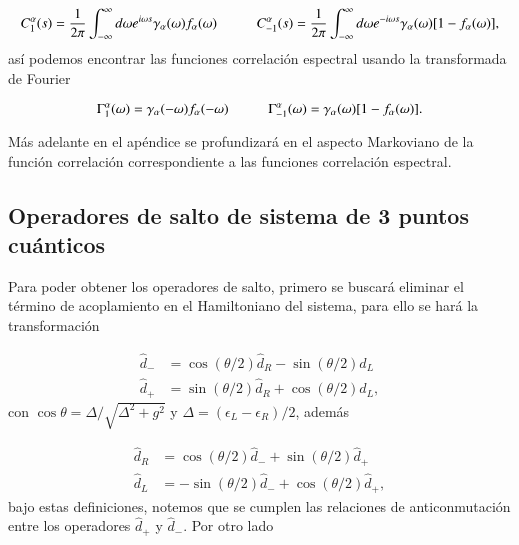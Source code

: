 \begin{appendixs}
\begin{equation*}
    C_{1}^{\alpha}(s) = \frac{1}{2\pi} \int_{-\infty}^{\infty}d\omega e^{i\omega s} \gamma_{\alpha}(\omega) f_{\alpha}(\omega)  \hspace{10mm} C_{-1}^{\alpha}(s) = \frac{1}{2\pi} \int_{-\infty}^{\infty}d\omega e^{-i\omega s} \gamma_{\alpha}(\omega) [1-f_{\alpha}(\omega)],
\end{equation*}
así podemos encontrar las funciones correlación espectral usando la transformada de Fourier

\begin{equation*}
    \Gamma_{1}^{\alpha}(\omega) = \gamma_{\alpha}(-\omega)f_{\alpha}(-\omega)  \hspace{10mm} \Gamma_{-1}^{\alpha}(\omega) = \gamma_{\alpha}(\omega)[1-f_{\alpha}(\omega)].
\end{equation*}

Más adelante en el apéndice se profundizará en el aspecto Markoviano de la función correlación correspondiente a las funciones correlación espectral.
\label{apendix5bathcorre}

\subsection{ Operadores de salto de sistema de 3 puntos cuánticos}
Para poder obtener los operadores de salto, primero se buscará eliminar el término de acoplamiento en el Hamiltoniano del sistema, para ello se hará la transformación

\begin{align*}
    \hat{d}_{-} & = \cos(\theta/2)\hat{d}_{R} - \sin(\theta/2)\hat{d}_{L} \\
    \hat{d}_{+} & = \sin(\theta/2)\hat{d}_{R} + \cos(\theta/2)\hat{d}_{L},
\end{align*}
con $\cos \theta = \Delta/\sqrt{ \Delta^{2} + g^{2} }$ y $\Delta = (\epsilon_{L} - \epsilon_{R})/2$, además  

\begin{align*}
    \hat{d}_{R} & = \cos(\theta/2)\hat{d}_{-} + \sin(\theta/2)\hat{d}_{+} \\
    \hat{d}_{L} & = -\sin(\theta/2)\hat{d}_{-} + \cos(\theta/2)\hat{d}_{+},
\end{align*}
bajo estas definiciones, notemos que se cumplen las relaciones de anticonmutación entre los operadores $\hat{d}_{+}$ y $\hat{d}_{-}$. Por otro lado


\end{appendixs}
